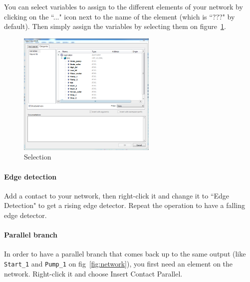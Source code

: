 \documentclass[10pt,a4paper]{article}
\begin{document}
You can select variables to assign to the different elements of your network by clicking on the ``..." icon next to the name of the element (which is ``???" by default).
Then simply assign the variables by selecting them on figure~\ref{fig:sel}.

\begin{figure}[h!]
	\begin{center}
		\includegraphics[width=250px]{img8.PNG}
	\end{center}
\caption{Selection}
\label{fig:sel}
\end{figure}

\paragraph{Edge detection}
Add a contact to your network, then right-click it and change it to ``Edge Detection" to get a rising edge detector.
Repeat the operation to have a falling edge detector.

\paragraph{Parallel branch}
In order to have a parallel branch that comes back up to the same output (like \texttt{Start\_1} and \texttt{Pump\_1} on fig~\ref{fig:network}), you first need an element on the network.
Right-click it and choose Insert Contact Parallel.



\end{document}
